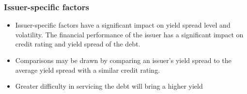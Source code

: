 \documentclass[../notes_compiled.tex]{subfiles}
\begin{document}
\subsubsection*{Issuer-specific factors}
\begin{itemize}
\item Issuer-specific factors have a significant impact on yield spread level and volatility. The financial performance of the issuer has a significant impact on credit rating and yield spread of the debt.
\item Comparisons may be drawn by comparing an issuer’s yield spread to the average yield spread with a similar credit rating.
\item Greater difficulty in servicing the debt will bring a higher yield
\end{itemize}
\end{document}
